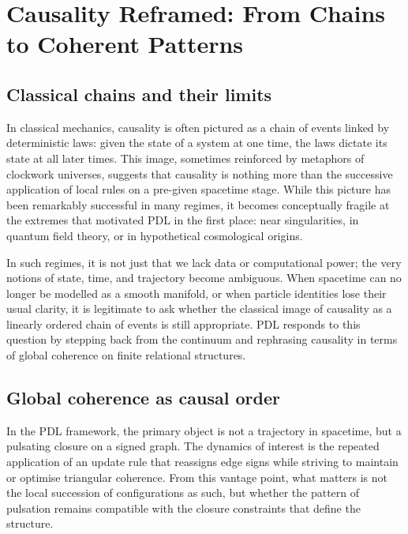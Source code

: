 \documentclass[11pt,a4paper]{article}
\theoremstyle{definition}
\begin{document}
\section{Causality Reframed: From Chains to Coherent Patterns}
\label{sec:causality}

\subsection{Classical chains and their limits}

In classical mechanics, causality is often pictured as a chain of events linked by deterministic laws: given the state of a system at one time, the laws dictate its state at all later times. This image, sometimes reinforced by metaphors of clockwork universes, suggests that causality is nothing more than the successive application of local rules on a pre-given spacetime stage. While this picture has been remarkably successful in many regimes, it becomes conceptually fragile at the extremes that motivated PDL in the first place: near singularities, in quantum field theory, or in hypothetical cosmological origins.\cite{Laubscher_EmergencePhysicalReality_2024,Laubscher_PDL_Position_2024}

In such regimes, it is not just that we lack data or computational power; the very notions of state, time, and trajectory become ambiguous. When spacetime can no longer be modelled as a smooth manifold, or when particle identities lose their usual clarity, it is legitimate to ask whether the classical image of causality as a linearly ordered chain of events is still appropriate.\cite{Laubscher_Existence_PulsatingClosure_2026} PDL responds to this question by stepping back from the continuum and rephrasing causality in terms of global coherence on finite relational structures.

\subsection{Global coherence as causal order}

In the PDL framework, the primary object is not a trajectory in spacetime, but a pulsating closure on a signed graph.\cite{Laubscher_IntroPDL_2024,Laubscher_EmergencePhysicalReality_2024} The dynamics of interest is the repeated application of an update rule that reassigns edge signs while striving to maintain or optimise triangular coherence. From this vantage point, what matters is not the local succession of configurations as such, but whether the pattern of pulsation remains compatible with the closure constraints that define the structure.
\end{document}
